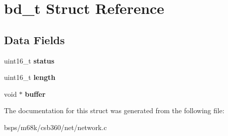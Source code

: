 \hypertarget{structbd__t}{}\section{bd\+\_\+t Struct Reference}
\label{structbd__t}
\subsection*{Data Fields}
\begin{DoxyCompactItemize}
\item 
\mbox{\label{structbd__t_ab7a31ca201ccfccc3bd46d8dbbe1b853}} 
uint16\+\_\+t {\bfseries status}
\item 
\mbox{\label{structbd__t_a084d9ccc8051a4e8a84cecd50690fcff}} 
uint16\+\_\+t {\bfseries length}
\item 
\mbox{\label{structbd__t_aed86395376c33f5fb28c6dddff02e123}} 
void $\ast$ {\bfseries buffer}
\end{DoxyCompactItemize}


The documentation for this struct was generated from the following file\+:\begin{DoxyCompactItemize}
\item 
bsps/m68k/csb360/net/network.\+c\end{DoxyCompactItemize}
